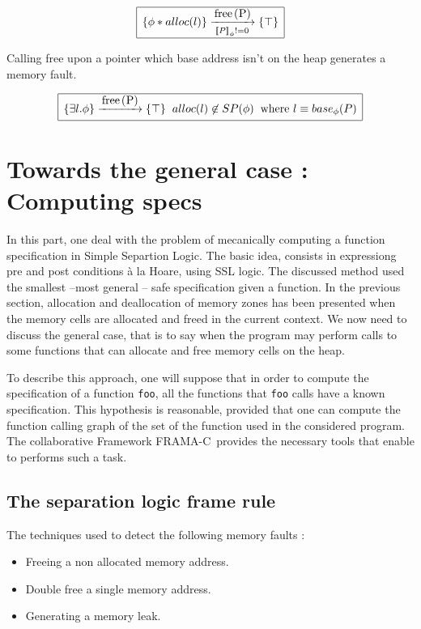 \documentclass[a4paper,twoside,12pt]{report}
\newcommand{\Sp}[1]{SP(#1)} %
\newcommand{\Alloc}[1]{alloc(#1)}
\newcommand{\Unsep}[0]{\ast}
\newcommand{\Sep}[2]{#1 \Unsep #2}
\newcommand{\base}[2]{base_{#1}(#2)}
\newcommand{\transmodel}[4]{\lbrace #1 \rbrace \arrow{#2}{#3} \lbrace #4 \rbrace }
\newcommand{\seq}[0]{\equiv} %
\newcommand{\interpa}[2]{\sem{#2}_{#1}}
\newcommand{\FRAMAC}{FRAMA-C}
\begin{document}
$$
\begin{array}{|l|}
\hline
\transmodel{\Sep{\phi}{\Alloc{l}}}{\mbox{\lstinline!free(P)!}}{
\interpa{\phi}{P}!=0}{\top} \\
\hline
\end{array}
$$

Calling free upon a pointer which base address isn't on the heap generates
a memory fault.

$$
\begin{array}{|l|}
\hline
\transmodel{\exists l. \phi}{\mbox{\lstinline!free(P)!}}{}{\top} \gspace \Alloc{l}\not\in \Sp{\phi} \gspace \mbox{where }l\seq\base{\phi}{P} \\
\hline
\end{array}
$$



\chapter{Towards the general case : Computing specs}

In this part, one deal with the problem of mecanically computing a function specification in  Simple Separtion Logic. The basic idea, consists in expressiong pre and post conditions \`{a} la Hoare, using SSL logic.
The discussed method used the smallest --most general -- safe specification given a function. In the previous section, allocation and deallocation of
memory zones has been presented when the memory cells are allocated and freed 
in the current context. We now need to discuss the general case, that is to
say when the program may perform calls to some functions that can allocate and
free memory cells on the heap.

To describe this approach, one will suppose that in order to compute the specification of a function \lstinline!foo!, all the functions that \lstinline!foo! calls have a known specification.
This hypothesis is reasonable, provided that one can compute the function 
calling graph of the set of the function used in the considered program. 
The collaborative Framework \FRAMAC~provides the necessary tools that enable
to performs such a task.



\section{The separation logic frame rule}

The techniques used to detect the following memory faults :
\begin{itemize}
\item Freeing a non allocated memory address.
\item Double free a single memory address.
\item Generating a memory leak. 
\end{itemize}
\end{document}
